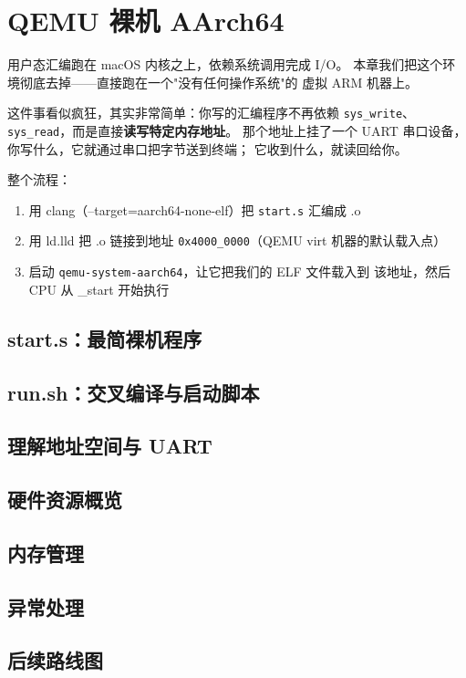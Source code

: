 \chapter{QEMU 裸机 AArch64}

用户态汇编跑在 macOS 内核之上，依赖系统调用完成 I/O。
本章我们把这个环境彻底去掉——直接跑在一个"没有任何操作系统"的
虚拟 ARM 机器上。

这件事看似疯狂，其实非常简单：你写的汇编程序不再依赖 \texttt{sys\_write}、
\texttt{sys\_read}，而是直接\textbf{读写特定内存地址}。
那个地址上挂了一个 UART 串口设备，你写什么，它就通过串口把字节送到终端；
它收到什么，就读回给你。

整个流程：

\begin{enumerate}
    \item 用 clang（--target=aarch64-none-elf）把 \texttt{start.s} 汇编成 .o
    \item 用 ld.lld 把 .o 链接到地址 \texttt{0x4000\_0000}（QEMU virt 机器的默认载入点）
    \item 启动 \texttt{qemu-system-aarch64}，让它把我们的 ELF 文件载入到
        该地址，然后 CPU 从 \_start 开始执行
\end{enumerate}

\section{start.s：最简裸机程序}


\section{run.sh：交叉编译与启动脚本}


\section{理解地址空间与 UART}


\section{硬件资源概览}


\section{内存管理}


\section{异常处理}


\section{后续路线图}

